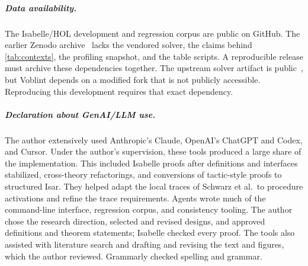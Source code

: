 \subparagraph*{Data availability.}
The Isabelle/HOL development and regression corpus are public on GitHub.
The earlier Zenodo archive~\cite{voblint} lacks the vendored solver, the
claims behind \cref{tab:contexts}, the profiling snapshot, and the table
scripts. A reproducible release must archive these dependencies together.
The upstream solver artifact is public~\cite{tilscher26artifact}, but
Voblint depends on a modified fork that is not publicly accessible.
Reproducing this development requires that exact dependency.

\subparagraph*{Declaration about GenAI/LLM use.}
The author extensively used Anthropic's Claude, OpenAI's ChatGPT and Codex,
and Cursor. Under the author's supervision, these tools produced a large
share of the implementation. This included Isabelle proofs after definitions
and interfaces stabilized, cross-theory refactorings, and conversions of
tactic-style proofs to structured Isar. They helped adapt the local traces of Schwarz et al.\ to
procedure activations and refine the trace requirements. Agents wrote much
of the command-line interface, regression corpus, and consistency tooling.
The author chose the research direction, selected and revised designs, and
approved definitions and theorem statements; Isabelle checked every proof.
The tools also assisted with literature search and drafting and revising the
text and figures, which the author reviewed. Grammarly checked spelling and
grammar.
